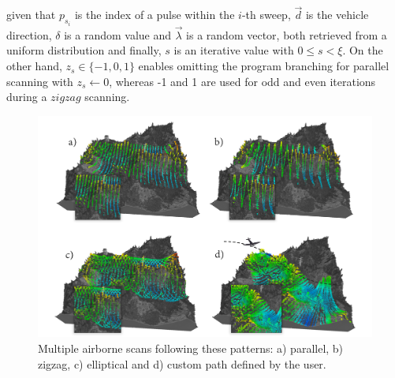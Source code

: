 given that $p_{s_{i}}$ is the index of a pulse within the $\textit{i}$-th sweep, $\vec{d}$ is the vehicle direction, $\delta$ is a random value and $\vec{\lambda}$ is a random vector, both retrieved from a uniform distribution and finally, $s$ is an iterative value with $0 \leq s < \xi$. On the other hand, $\textit{z}_{s} \in \{-1, 0, 1\}$ enables omitting the program branching for parallel scanning with $\textit{z}_{s} \gets 0$, whereas -1 and 1 are used for odd and even iterations during a $\textit{zigzag}$ scanning.

\begin{figure}
    \centering
    \includegraphics[width=\linewidth]{figs/lidar_simulation/als_patterns.png}
	\caption{Multiple airborne scans following these patterns: a) parallel, b) zigzag, c) elliptical and d) custom path defined by the user. }
	\label{fig:als_patterns}
\end{figure}

